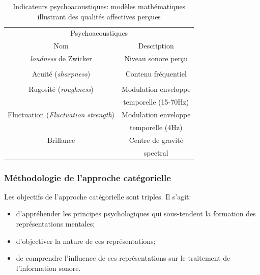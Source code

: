 {\begin{table}[t]
\centering
\begin{tabular}{c c} 
\multicolumn{2}{c}{Psychoacoustiques} \\ 
Nom                           & Description            \\                      
\hline
\emph{loudness} de Zwicker                & Niveau sonore perçu     \\
                                          &         \\
Acuité (\emph{sharpness})                 & Contenu fréquentiel       \\
                                          &         \\
Rugosité (\emph{roughness})               & Modulation enveloppe        \\
                                          & temporelle (15-70Hz)       \\
Fluctuation (\emph{Fluctuation strength}) & Modulation enveloppe      \\
                                          & temporelle (4Hz)          \\
Brillance                                 & Centre de gravité       \\
                                          & spectral         \\                                       
\hline
\end{tabular}
\vspace{0.5mm}
\caption{Indicateurs psychoacoustiques: modèles mathématiques illustrant des qualités affectives perçues}
\label{tab:psychoAcousIndi}
\end{table}


\subsubsection{Méthodologie de l'approche catégorielle}
\label{sec:ch3_appCategorielle}

Les objectifs de l'approche catégorielle sont triples. Il s'agit:

\begin{itemize}
\item d'appréhender les principes psychologiques qui sous-tendent la formation des représentations mentales;
\item d'objectiver la nature de ces représentations;
\item de comprendre l'influence de ces représentations sur le traitement de l'information sonore.
\end{itemize}
 
}
